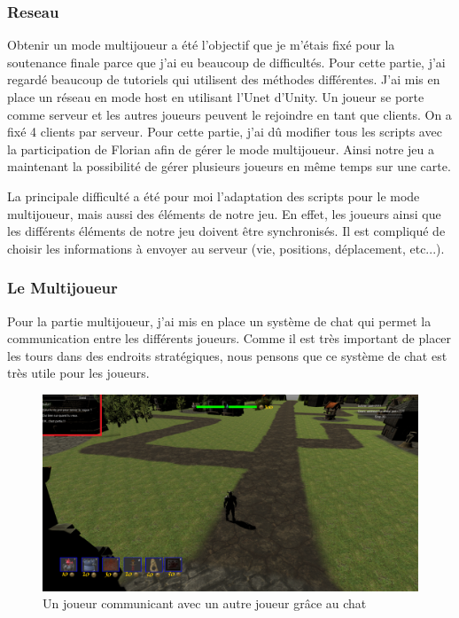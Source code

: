 \documentclass[a4paper, 12pt]{article}
\begin{document}
	\subsubsection{Reseau}
\par Obtenir un mode multijoueur a été l’objectif que je m’étais fixé pour la soutenance finale parce que j’ai eu beaucoup de difficultés. Pour cette partie, j’ai regardé beaucoup de tutoriels qui utilisent des méthodes différentes. J’ai mis en place un réseau en mode host en utilisant l’Unet d'Unity. Un joueur se porte comme serveur et les autres joueurs peuvent le rejoindre en tant que clients. On a fixé 4 clients par serveur. Pour cette partie, j’ai dû modifier tous les scripts avec la participation de Florian afin de gérer le mode multijoueur. Ainsi notre jeu a maintenant la possibilité de gérer plusieurs joueurs en même temps sur une carte.
\par La principale difficulté a été pour moi l’adaptation des scripts pour le mode multijoueur, mais aussi des éléments de notre jeu. En effet, les joueurs ainsi que les différents éléments de notre jeu doivent être synchronisés. Il est compliqué de choisir les informations à envoyer au serveur (vie, positions, déplacement, etc...).

\subsubsection{Le Multijoueur}

Pour la partie multijoueur, j’ai mis en place un système de chat qui permet la communication entre les différents joueurs. Comme il est très important de placer les tours dans des endroits stratégiques, nous pensons que ce système de chat est très utile pour les joueurs.
\begin{figure}[!ht]
\centerline{\includegraphics[scale=0.3]{Chat.png}}
\caption*{Un joueur communicant avec un autre joueur gr\^ace au chat}
\end{figure}
\end{document}
